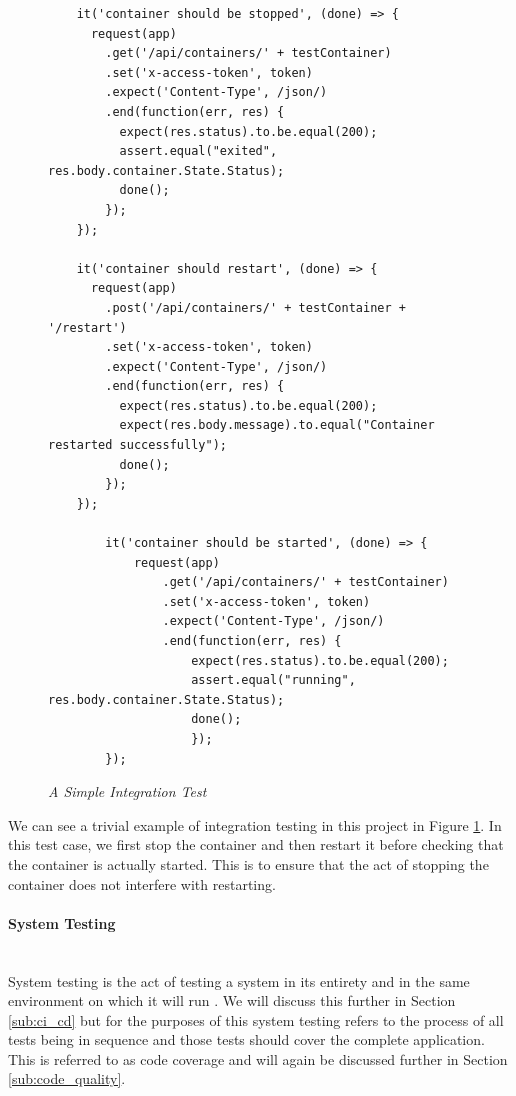\begin{figure}[!ht]
\begin{lstlisting}
	it('container should be stopped', (done) => {
      request(app)
        .get('/api/containers/' + testContainer)
        .set('x-access-token', token)
        .expect('Content-Type', /json/)
        .end(function(err, res) {
          expect(res.status).to.be.equal(200);
          assert.equal("exited", res.body.container.State.Status);
          done();
        });
    });

    it('container should restart', (done) => {
      request(app)
        .post('/api/containers/' + testContainer + '/restart')
        .set('x-access-token', token)
        .expect('Content-Type', /json/)
        .end(function(err, res) {
          expect(res.status).to.be.equal(200);
          expect(res.body.message).to.equal("Container restarted successfully");
          done();
        });
    });
		
		it('container should be started', (done) => {
			request(app)
				.get('/api/containers/' + testContainer)
				.set('x-access-token', token)
				.expect('Content-Type', /json/)
				.end(function(err, res) {
					expect(res.status).to.be.equal(200);
					assert.equal("running", res.body.container.State.Status);
					done();
					});
		});
\end{lstlisting}
\caption{\em A Simple Integration Test}
\label{fig:integration_test}
\end{figure}

We can see a trivial example of integration testing in this project in Figure \ref{fig:integration_test}. In this test case, we first stop the container and then restart it before checking that the container is actually started. This is to ensure that the act of stopping the container does not interfere with restarting.

\paragraph{System Testing}\mbox{}\\
System testing is the act of testing a system in its entirety and in the same environment on which it will run \citep{SystemTesting2017}. We will discuss this further in Section \ref{sub:ci_cd} but for the purposes of this system testing refers to the process of all tests being in sequence and those tests should cover the complete application. This is referred to as \gls{code coverage} and will again be discussed further in Section \ref{sub:code_quality}. 

